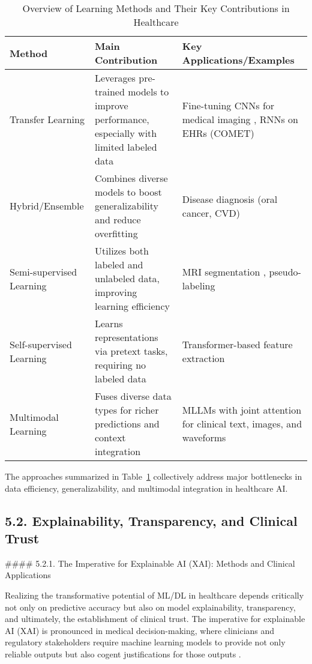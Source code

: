 \documentclass[11pt]{article}
\begin{document}
\begin{table}[ht]
\centering
\caption{Overview of Learning Methods and Their Key Contributions in Healthcare}
\label{tab:learning_methods}
\begin{tabular}{|l|p{6cm}|p{6cm}|}
\hline
\textbf{Method}      & \textbf{Main Contribution}                                        & \textbf{Key Applications/Examples} \\ \hline
Transfer Learning    & Leverages pre-trained models to improve performance, especially with limited labeled data & Fine-tuning CNNs for medical imaging \cite{ref31,ref54,ref90}, RNNs on EHRs (COMET) \cite{ref49} \\ \hline
Hybrid/Ensemble      & Combines diverse models to boost generalizability and reduce overfitting                   & Disease diagnosis (oral cancer, CVD) \cite{ref53,ref71,ref90} \\ \hline
Semi-supervised Learning & Utilizes both labeled and unlabeled data, improving learning efficiency                  & MRI segmentation \cite{ref61,ref77}, pseudo-labeling \cite{ref76} \\ \hline
Self-supervised Learning & Learns representations via pretext tasks, requiring no labeled data                     & Transformer-based feature extraction \cite{ref41,ref55,ref106} \\ \hline
Multimodal Learning  & Fuses diverse data types for richer predictions and context integration                     & MLLMs with joint attention for clinical text, images, and waveforms \cite{ref31,ref49,ref76,ref106} \\ \hline
\end{tabular}
\end{table}

The approaches summarized in Table~\ref{tab:learning_methods} collectively address major bottlenecks in data efficiency, generalizability, and multimodal integration in healthcare AI.

\subsection{5.2. Explainability, Transparency, and Clinical Trust}

#### 5.2.1. The Imperative for Explainable AI (XAI): Methods and Clinical Applications

Realizing the transformative potential of ML/DL in healthcare depends critically not only on predictive accuracy but also on model explainability, transparency, and ultimately, the establishment of clinical trust. The imperative for explainable AI (XAI) is pronounced in medical decision-making, where clinicians and regulatory stakeholders require machine learning models to provide not only reliable outputs but also cogent justifications for those outputs \cite{ref11,ref39,ref50,ref65,ref80}.
\end{document}
